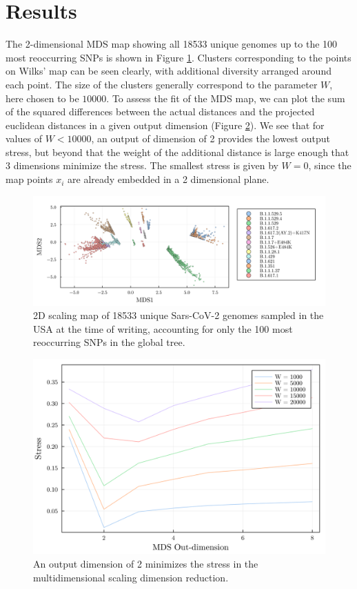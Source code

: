 \documentclass{article}
\begin{document}
\section{Results}
    The 2-dimensional MDS map showing all 18533 unique genomes up to the 100 most reoccurring SNPs is shown in Figure \ref{map}.
    Clusters corresponding to the points on Wilks' map can be seen clearly, with additional diversity arranged around each point.
    The size of the clusters generally correspond to the parameter $W$, here chosen to be $10000$.
    To assess the fit of the MDS map, we can plot the sum of the squared differences between the actual distances and the projected euclidean distances in a given output dimension (Figure \ref{stress}).
    We see that for values of $W < 10000$, an output of dimension of 2 provides the lowest output stress, but beyond that the weight of the additional distance is large enough that 3 dimensions minimize the stress.
    The smallest stress is given by $W=0$, since the map points $x_i$ are already embedded in a 2 dimensional plane.


\begin{figure}
    \includegraphics[width=\textwidth]{../SarsEvoModel/plots/homoplasy_usa/homoplasy_usa_10000_mds_multidimensional_scaling.png}    
    \caption{2D scaling map of 18533 unique Sars-CoV-2 genomes sampled in the USA at the time of writing, accounting for only the 100 most reoccurring SNPs in the global tree.} 
    \label{map}
\end{figure}


\begin{figure}
    \includegraphics[width=\textwidth]{../SarsEvoModel/plots/combined_mds_stress.png}    
    \caption{An output dimension of 2 minimizes the stress in the multidimensional scaling dimension reduction.}
    \label{stress}
\end{figure}%
\end{document}
